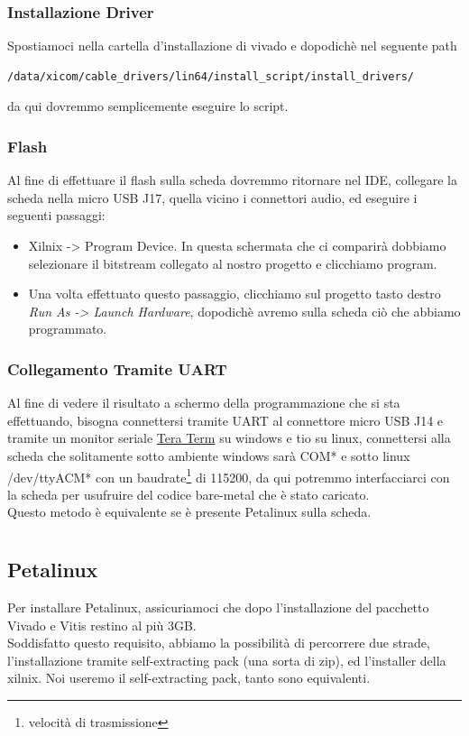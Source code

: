\subsection{Installazione Driver}
Spostiamoci nella cartella d'installazione di vivado e dopodichè nel seguente path
\begin{lstlisting}
/data/xicom/cable_drivers/lin64/install_script/install_drivers/
\end{lstlisting}
da qui dovremmo semplicemente eseguire lo script.
\subsection{Flash}
Al fine di effettuare il flash sulla scheda dovremmo ritornare nel IDE, collegare la scheda nella micro USB J17, quella vicino i connettori audio, ed eseguire i seguenti passaggi:
\begin{itemize}
    \item Xilnix -> Program Device. In questa schermata che ci comparirà dobbiamo selezionare il bitstream collegato al nostro progetto e clicchiamo program.
    \item Una volta effettuato questo passaggio, clicchiamo sul progetto tasto destro \textit{Run As -> Launch Hardware}, dopodichè avremo sulla scheda ciò che abbiamo programmato.
\end{itemize}
\subsection{Collegamento Tramite UART}
Al fine di vedere il risultato a schermo della programmazione che si sta effettuando, bisogna connettersi tramite UART al connettore micro USB J14 e tramite un monitor seriale \href{https://ttssh2.osdn.jp/index.html.en}{Tera Term} su windows e tio su linux, connettersi alla scheda che solitamente sotto ambiente windows sarà COM* e sotto linux /dev/ttyACM* con un baudrate\footnote{velocità di trasmissione} di 115200, da qui potremmo interfacciarci con la scheda per usufruire del codice bare-metal che è stato caricato. \\
Questo metodo è equivalente se è presente Petalinux sulla scheda.



\chapter{}

\section{Petalinux}
\label{petalinuxinst}
Per installare Petalinux, assicuriamoci che dopo l'installazione del pacchetto Vivado e Vitis restino al più 3GB.\\
Soddisfatto questo requisito, abbiamo la possibilità di percorrere due strade, l'installazione tramite self-extracting pack (una sorta di zip), ed l'installer della xilnix. Noi useremo il self-extracting pack, tanto sono equivalenti.\\
